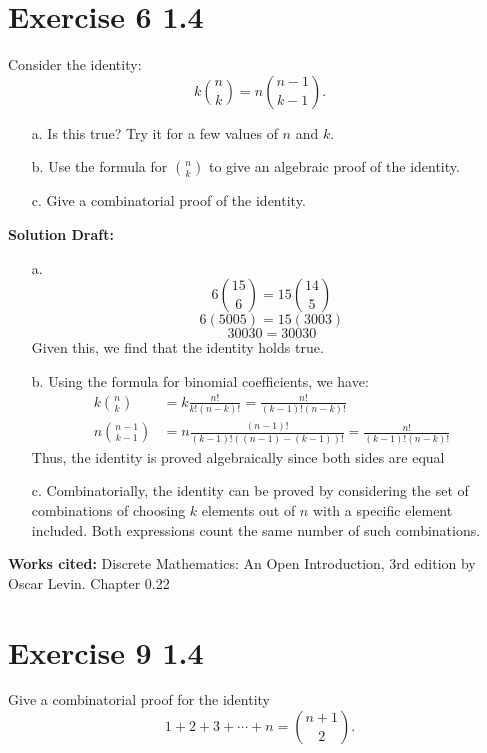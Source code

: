 \documentclass{article}
\begin{document}
\section*{Exercise 6 1.4}  

Consider the identity:
\[
k \binom{n}{k} = n \binom{n - 1}{k - 1}.
\]

\begin{enumerate}
    \item[a.] Is this true? Try it for a few values of \( n \) and \( k \).
    \item[b.] Use the formula for \( \binom{n}{k} \) to give an algebraic proof of the identity.
    \item[c.] Give a combinatorial proof of the identity.
\end{enumerate}

\vspace{0.5cm}
\noindent\textbf{Solution Draft:} 
\vspace{0.2cm}

\begin{enumerate}
    \item[a.] \[6 \binom{15}{6} = 15 \binom{14}{5}\]\[6(5005)=15(3003)\]\[30030=30030\] Given this, we find that the identity holds true.
    \item[b.] Using the formula for binomial coefficients, we have:
    \begin{align*}
    k \binom{n}{k} &= k \frac{n!}{k!(n - k)!} = \frac{n!}{(k - 1)!(n - k)!} \\
    n \binom{n - 1}{k - 1} &= n \frac{(n - 1)!}{(k - 1)!((n - 1) - (k - 1))!} = \frac{n!}{(k - 1)!(n - k)!}
    \end{align*}
    Thus, the identity is proved algebraically since both sides are equal
    \item[c.] Combinatorially, the identity can be proved by considering the set of combinations of choosing \( k \) elements out of \( n \) with a specific element included. Both expressions count the same number of such combinations.
\end{enumerate}
\vspace{0.5cm}
\textbf{Works cited:}
Discrete Mathematics: An Open Introduction, 3rd edition by Oscar Levin. Chapter 0.22
\section*{Exercise 9 1.4}  

Give a combinatorial proof for the identity 
\[
1 + 2 + 3 + \cdots + n = \binom{n+1}{2}.
\]
\end{document}
